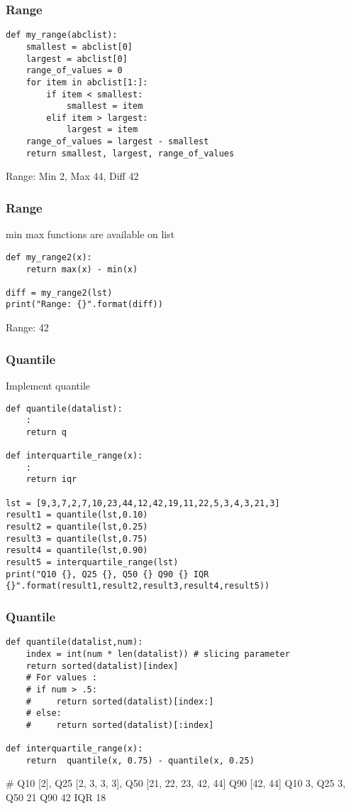\begin{frame}[fragile]\frametitle{Range}
\begin{lstlisting}
def my_range(abclist):
    smallest = abclist[0]
    largest = abclist[0]
    range_of_values = 0
    for item in abclist[1:]:
        if item < smallest:
            smallest = item
        elif item > largest:
            largest = item
    range_of_values = largest - smallest
    return smallest, largest, range_of_values
\end{lstlisting}
Range: Min 2, Max 44, Diff 42
\end{frame}

\begin{frame}[fragile]\frametitle{Range}
min max functions are available on list
\begin{lstlisting}
def my_range2(x):
	return max(x) - min(x)

diff = my_range2(lst)
print("Range: {}".format(diff))	
\end{lstlisting}
Range: 42
\end{frame}

\begin{frame}[fragile]\frametitle{Quantile}
Implement quantile
\begin{lstlisting}
def quantile(datalist):
	:
	return q

def interquartile_range(x):
	:
	return iqr
	
lst = [9,3,7,2,7,10,23,44,12,42,19,11,22,5,3,4,3,21,3]
result1 = quantile(lst,0.10)
result2 = quantile(lst,0.25)
result3 = quantile(lst,0.75)
result4 = quantile(lst,0.90)
result5 = interquartile_range(lst)
print("Q10 {}, Q25 {}, Q50 {} Q90 {} IQR {}".format(result1,result2,result3,result4,result5))
\end{lstlisting}
\end{frame}

\begin{frame}[fragile]\frametitle{Quantile}
\begin{lstlisting}
def quantile(datalist,num):
    index = int(num * len(datalist)) # slicing parameter
    return sorted(datalist)[index]
    # For values :
    # if num > .5:
    #     return sorted(datalist)[index:]
    # else:
    #     return sorted(datalist)[:index]

def interquartile_range(x):
    return	quantile(x, 0.75) - quantile(x, 0.25)
\end{lstlisting}
\# Q10 [2], Q25 [2, 3, 3, 3], Q50 [21, 22, 23, 42, 44] Q90 [42, 44]
Q10 3, Q25 3, Q50 21 Q90 42 IQR 18
\end{frame}


